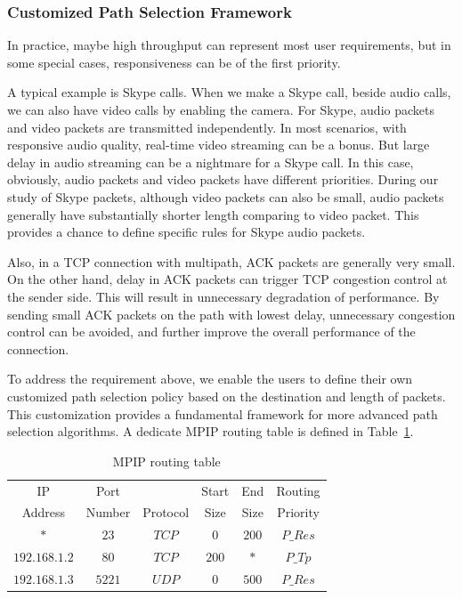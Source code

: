\subsubsection{Customized Path Selection Framework}
\label{sec:resp}
In practice, maybe high throughput can represent most user requirements, but in some special cases, responsiveness can be of the first priority. 

A typical example is Skype\cite{skype} calls. When we make a Skype call, beside audio calls, we can also have video calls by enabling the camera. For Skype, audio packets and video packets are transmitted independently. In most scenarios, with responsive audio quality, real-time video streaming can be a bonus. But large delay in audio streaming can be a nightmare for a Skype call. In this case, obviously, audio packets and video packets have different priorities. During our study of Skype packets, although video packets can also be small, audio packets generally have substantially shorter length comparing to video packet. This provides a chance to define specific rules for Skype audio packets.

Also, in a TCP connection with multipath, ACK packets are generally very small. On the other hand, delay in ACK packets can trigger TCP congestion control at the sender side. This will result in unnecessary degradation of performance. By sending small ACK packets on the path with lowest delay, unnecessary congestion control can be avoided, and further improve the overall performance of the connection.

To address the requirement above, we enable the users to define their own customized path selection policy based on the destination and length of packets. This customization provides a fundamental framework for more advanced path selection algorithms. A dedicate MPIP routing table is defined in Table~\ref{tb.route}.

\begin{table}[htbp]
\caption{\label{tb.route}MPIP routing table}
\centering
\begin{tabular}{|c|c|c|c|c|c|}
\hline
 IP   		&   Port   &          & Start  & End    & Routing       \\
 Address    &  Number     & Protocol & Size   & Size & Priority       \\
\hline
$*$&$23$&$TCP$&$0$&$200$&$P\_Res$   \\
\hline
$192.168.1.2$&$80$&$TCP$&$200$&$*$&$P\_Tp$   \\
\hline
$192.168.1.3$&$5221$&$UDP$&$0$&$500$&$P\_Res$  \\
\hline
\end{tabular}
\end{table}

